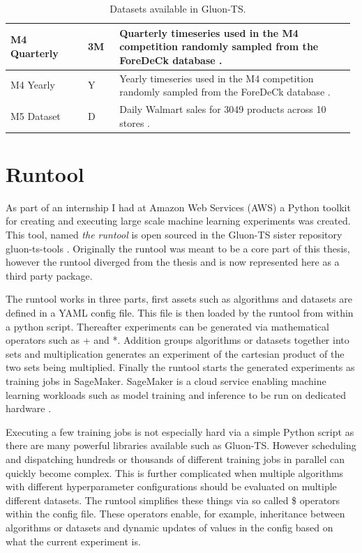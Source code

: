 \begin{table}[h]
\begin{tabular}{p{0.22\linewidth} | p{0.09\linewidth} | p{0.67\linewidth}}
    \hline
    M4 Quarterly       & 3M     & Quarterly timeseries used in the M4 competition randomly sampled from the ForeDeCk database \cite{makridakis_m4_2020}.                                                                                                                                             \\
    \hline
    M4 Yearly          & Y      & Yearly timeseries used in the M4 competition randomly sampled from the ForeDeCk database \cite{makridakis_m4_2020}.                                                                                                                                                \\
    \hline
    M5 Dataset         & D      & Daily Walmart sales for 3049 products across 10 stores \cite{gluonts-github, m5}.
  \end{tabular}
  \caption{Datasets available in Gluon-TS.}
  \label{tab:datasets}
\end{table}
\clearpage
\section{Runtool}
\label{subsec:runtool}

As part of an internship I had at Amazon Web Services (AWS) a Python toolkit for creating and executing large scale machine learning experiments was created. This tool, named \textit{the runtool} is open sourced in the Gluon-TS sister repository gluon-ts-tools \cite{the_runtool}. Originally the runtool was meant to be a core part of this thesis, however the runtool diverged from the thesis and is now represented here as a third party package.

The runtool works in three parts, first assets such as algorithms and datasets are defined in a YAML config file. This file is then loaded by the runtool from within a python script. Thereafter experiments can be generated via mathematical operators such as + and *. Addition groups algorithms or datasets together into sets and multiplication generates an experiment of the cartesian product of the two sets being multiplied. Finally the runtool starts the generated experiments as training jobs in SageMaker. SageMaker is a cloud service enabling machine learning workloads such as model training and inference to be run on dedicated hardware \cite{sagemaker_website}.

Executing a few training jobs is not especially hard via a simple Python script as there are many powerful libraries available such as Gluon-TS. However scheduling and dispatching hundreds or thousands of different training jobs in parallel can quickly become complex. This is further complicated when multiple algorithms with different hyperparameter configurations should be evaluated on multiple different datasets. The runtool simplifies these things via so called \$ operators within the config file. These operators enable, for example, inheritance between algorithms or datasets and dynamic updates of values in the config based on what the current experiment is.

